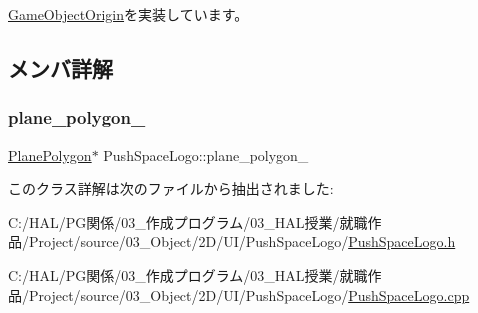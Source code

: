 \mbox{\hyperlink{class_game_object_origin_aeac8fc4a1f625982313a9a60dd35d016}{Game\+Object\+Origin}}を実装しています。



\subsection{メンバ詳解}
\mbox{\label{class_push_space_logo_ab35a4cee269c3ba0b709a8951ccc3d42}} 
\subsubsection{\texorpdfstring{plane\+\_\+polygon\+\_\+}{plane\_polygon\_}}
{\footnotesize\ttfamily \mbox{\hyperlink{class_plane_polygon}{Plane\+Polygon}}$\ast$ Push\+Space\+Logo\+::plane\+\_\+polygon\+\_\+}



このクラス詳解は次のファイルから抽出されました\+:\begin{DoxyCompactItemize}
\item 
C\+:/\+H\+A\+L/\+P\+G関係/03\+\_\+作成プログラム/03\+\_\+\+H\+A\+L授業/就職作品/\+Project/source/03\+\_\+\+Object/2\+D/\+U\+I/\+Push\+Space\+Logo/\mbox{\hyperlink{_push_space_logo_8h}{Push\+Space\+Logo.\+h}}\item 
C\+:/\+H\+A\+L/\+P\+G関係/03\+\_\+作成プログラム/03\+\_\+\+H\+A\+L授業/就職作品/\+Project/source/03\+\_\+\+Object/2\+D/\+U\+I/\+Push\+Space\+Logo/\mbox{\hyperlink{_push_space_logo_8cpp}{Push\+Space\+Logo.\+cpp}}\end{DoxyCompactItemize}
